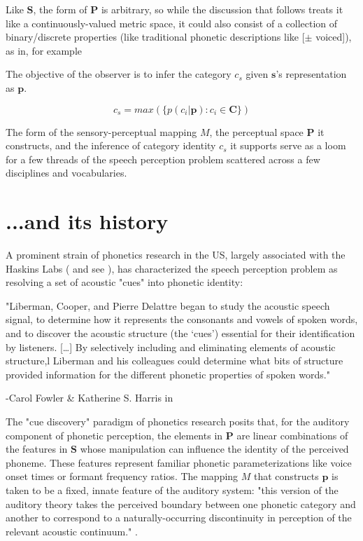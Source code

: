 Like $\mathbf{S}$, the form of $\mathbf{P}$ is arbitrary, so while the discussion that follows treats it like a continuously-valued metric space, it could also consist of a collection of binary/discrete properties (like traditional phonetic descriptions like [$\pm$ voiced]), as in, for example \citep{Tversky1977,leeExtendingALCOVEModel2002}

The objective of the observer is to infer the category $c_s$ given $\mathbf{s}$'s representation as $\mathbf{p}$.

\begin{equation}
\label{eqn:infer}
c_s = max( \{ p(c_i | \mathbf{p}) : c_i \in \mathbf{C} \})
\end{equation}

The form of the sensory-perceptual mapping $M$, the perceptual space $\mathbf{P}$ it constructs, and the inference of category identity $c_s$ it supports serve as a loom for a few threads of the speech perception problem scattered across a few disciplines and vocabularies.

\section{...and its history}

A prominent strain of phonetics research in the US, largely associated with the Haskins Labs (\citep{schertzPhoneticCueWeighting2020} and see \citep[p.~51]{ohalaGuideHistoryPhonetic1999}), has characterized the speech perception problem as resolving a set of acoustic "cues" into phonetic identity:

\begin{leftbar}
"Liberman, Cooper, and Pierre Delattre began to study the acoustic speech signal, to determine how it represents the consonants and vowels of spoken words, and to discover the acoustic structure (the `cues') essential for their identification by listeners. [\dots] By selectively including and eliminating elements of acoustic structure,l Liberman and his colleagues could determine what bits of structure provided information for the different phonetic properties of spoken words."

-Carol Fowler \& Katherine S. Harris in \citep[p.~51]{ohalaGuideHistoryPhonetic1999}
\end{leftbar}

The "cue discovery" paradigm of phonetics research posits that, for the auditory component of phonetic perception, the elements in $\mathbf{P}$ are linear combinations of the features in $\mathbf{S}$ whose manipulation can influence the identity of the perceived phoneme. These features represent familiar phonetic parameterizations like voice onset times or formant frequency ratios. The mapping $M$ that constructs $\mathbf{p}$ is taken to be a fixed, innate feature of the auditory system: "this version of the auditory theory takes the perceived boundary between one phonetic category and another to correspond to a naturally-occurring discontinuity in perception of the relevant acoustic continuum." \citep{Liberman1985a}. 

